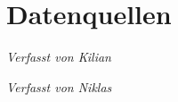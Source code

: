 \documentclass[../main.tex]{subfiles}
\begin{document}
\chapter{Datenquellen}
\vspace{-0.5cm}
\noindent\textit{\small Verfasst von Kilian}
\vspace{0.5cm}


\vspace{-0.5cm}
\noindent\textit{\small Verfasst von Niklas}
\vspace{0.5cm}
\end{document}
